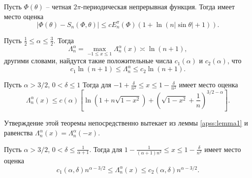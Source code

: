 \begin{corollary}\label{apss:col2} Пусть $\Phi(\theta)$ -- четная $2\pi$-периодическая непрерывная функция. Тогда имеет место оценка
\begin{equation}\label{apsseq.1.2.4.3.85}|\Phi(\theta)-S_n(\Phi,\theta)|\le c E_n^{\pi}(\Phi)(1+\ln(n|\sin\theta|+1)).\end{equation}
\end{corollary}

\begin{corollary}\label{apss:col3} Пусть $\frac12\le\alpha\le\frac32$. Тогда
\begin{equation}\label{apsseq.1.2.4.3.86}\Lambda_n^{\alpha}=\max_{-1\le x\le1}\Lambda_n^\alpha(x)\asymp\ln(n+1),\end{equation}
другими словами, найдутся такие положительные числа $c_1(\alpha)$ и $c_2(\alpha)$, что
\begin{equation}\label{apsseq.1.2.4.3.87}c_1\ln(n+1)\le\Lambda_n^\alpha\le c_2\ln(n+1).\end{equation}

\end{corollary}

\begin{theorem} Пусть  $\alpha>3/2$, $0<\delta\le1$
Тогда для $-1+\frac\delta{n^2}\le x\le 1-\frac\delta{n^2}$ имеет место оценка
$$
\Lambda_n^\alpha(x)\le c(\alpha)\left[\ln(1+n\sqrt{1-x^2})+\left(\sqrt{1-x^2}+\frac1n\right)^{3/2-\alpha}\right].
$$
\end{theorem}
Утверждение этой теоремы непосредственно вытекает из леммы \ref{apss:lemma1} и равенства $\Lambda_n^\alpha(x)=\Lambda_n^\alpha(-x)$.

\begin{theorem} Пусть  $\alpha>3/2$, $0<\delta\le\frac 1{\alpha+1}$.
Тогда для $1-\frac1{(\alpha+1)n^2}\le x\le 1-\frac\delta{n^2}$ имеет место оценка
\begin{equation}\label{eq.1.2.4.3.90}
c_1(\alpha,\delta)n^{\alpha-3/2}\le\Lambda_n^\alpha(x)\le c_2(\alpha,\delta)n^{\alpha-3/2}.
\end{equation}
\end{theorem}

